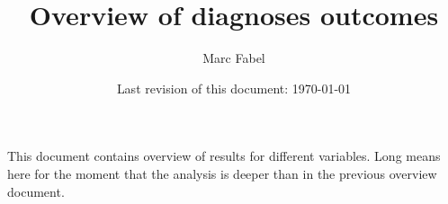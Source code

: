 \documentclass[11pt, a4paper]{scrartcl} %
\author{Marc Fabel}
\title{Overview of diagnoses outcomes}
\date{Last revision of this document: \today}
\begin{document}
\maketitle
This document contains overview of results for different variables. Long means here for the moment that the analysis is deeper than in the previous overview document.


%
%
%
%
\end{document}
